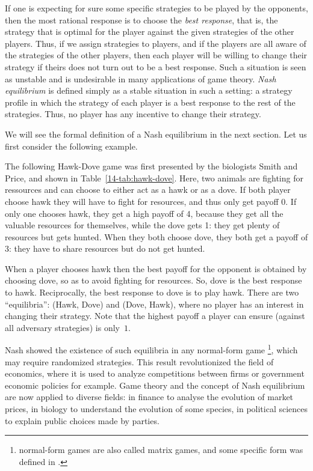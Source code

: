 If one is expecting for sure some specific strategies to be played by the
opponents, then the most rational response is to choose the
\emph{best response}, that is, the strategy that is optimal for the
player against the given strategies of the other players. Thus, if we
assign strategies to players, and if the players are all aware of the
strategies of the other players, then each player will be willing to
change their strategy if theirs does not turn out to be a best response.
Such a situation is seen as unstable and is undesirable in many
applications of game theory. \emph{Nash equilibrium} is defined simply
as a stable situation in such a setting: a strategy profile in which the
strategy of each player is a best response to the rest of the
strategies. Thus, no player has any incentive to change their strategy.

We will see the formal definition of a Nash equilibrium in the next
section. Let us first consider the following example.

The following Hawk-Dove game was first presented by the biologists Smith
and Price, and shown in Table~\ref{14-tab:hawk-dove}.
Here, two animals are fighting for ressources and can choose to
either act as a hawk or as a dove.
If both player choose hawk they will have to fight for resources, and
thus only get payoff 0. If only one chooses hawk, they get a high payoff of
4, because they get all the valuable resources for themselves, while the dove
gets 1: they get plenty of resources but gets hunted. When they both choose
dove, they both get a payoff of 3: they have to share resources but do not get
hunted.

When a player chooses hawk then the best payoff for the opponent is
obtained by choosing dove, so as to avoid fighting for resources.
So, dove is the best response to hawk. Reciprocally, the best response to
dove is to play hawk. There are two ``equilibria'': (Hawk, Dove) and
(Dove, Hawk), where no player has an interest in changing their
strategy. Note that the highest payoff a player can ensure
(against all adversary strategies) is only~$1$.

Nash showed the existence of such equilibria in any normal-form game
\footnote{normal-form games are also called matrix games, and some
specific form was defined in .},
which may require randomized strategies. This result
revolutionized the field of economics, where it is used to analyze
competitions between firms or government economic policies for example.
Game theory and the concept of Nash equilibrium are now applied to
diverse fields: in finance to analyse the evolution of market prices, in
biology to understand the evolution of some species, in political
sciences to explain public choices made by parties.

